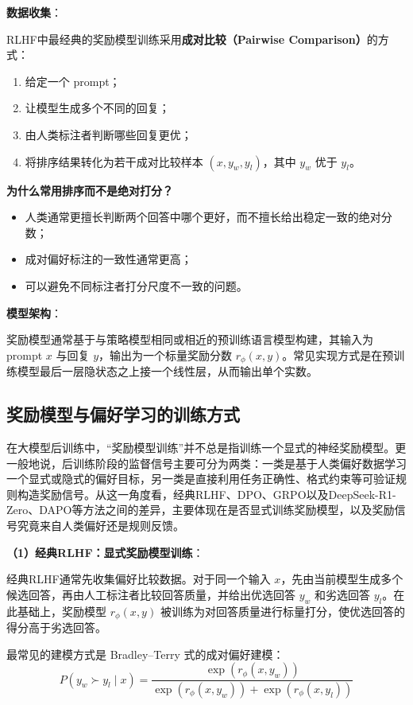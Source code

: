 \documentclass[UTF8]{ctexart}
\begin{document}
\textbf{数据收集}：

RLHF中最经典的奖励模型训练采用\textbf{成对比较（Pairwise Comparison）}的方式：
\begin{enumerate}
    \item 给定一个 prompt；
    \item 让模型生成多个不同的回复；
    \item 由人类标注者判断哪些回复更优；
    \item 将排序结果转化为若干成对比较样本 $(x, y_w, y_l)$，其中 $y_w$ 优于 $y_l$。
\end{enumerate}

\textbf{为什么常用排序而不是绝对打分？}
\begin{itemize}
    \item 人类通常更擅长判断两个回答中哪个更好，而不擅长给出稳定一致的绝对分数；
    \item 成对偏好标注的一致性通常更高；
    \item 可以避免不同标注者打分尺度不一致的问题。
\end{itemize}

\textbf{模型架构}：

奖励模型通常基于与策略模型相同或相近的预训练语言模型构建，其输入为 prompt $x$ 与回复 $y$，输出为一个标量奖励分数 $r_{\phi}(x,y)$。常见实现方式是在预训练模型最后一层隐状态之上接一个线性层，从而输出单个实数。

\subsection{奖励模型与偏好学习的训练方式}

在大模型后训练中，“奖励模型训练”并不总是指训练一个显式的神经奖励模型。更一般地说，后训练阶段的监督信号主要可分为两类：一类是基于人类偏好数据学习一个显式或隐式的偏好目标，另一类是直接利用任务正确性、格式约束等可验证规则构造奖励信号。从这一角度看，经典RLHF、DPO、GRPO以及DeepSeek-R1-Zero、DAPO等方法之间的差异，主要体现在是否显式训练奖励模型，以及奖励信号究竟来自人类偏好还是规则反馈。

\textbf{（1）经典RLHF：显式奖励模型训练}：

经典RLHF通常先收集偏好比较数据。对于同一个输入 $x$，先由当前模型生成多个候选回答，再由人工标注者比较回答质量，并给出优选回答 $y_w$ 和劣选回答 $y_l$。在此基础上，奖励模型 $r_{\phi}(x,y)$ 被训练为对回答质量进行标量打分，使优选回答的得分高于劣选回答。

最常见的建模方式是 Bradley--Terry 式的成对偏好建模：
\[
P(y_w \succ y_l \mid x)
=
\frac{\exp(r_{\phi}(x,y_w))}
{\exp(r_{\phi}(x,y_w))+\exp(r_{\phi}(x,y_l))}
\]
\end{document}
